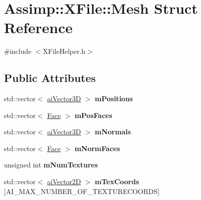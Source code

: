 \hypertarget{struct_assimp_1_1_x_file_1_1_mesh}{\section{Assimp\+:\+:X\+File\+:\+:Mesh Struct Reference}
\label{struct_assimp_1_1_x_file_1_1_mesh}
}


{\ttfamily \#include $<$X\+File\+Helper.\+h$>$}

\subsection*{Public Attributes}
\begin{DoxyCompactItemize}
\item 
\hypertarget{struct_assimp_1_1_x_file_1_1_mesh_ab46ed3ee07e3ae844591022285e7b9e9}{std\+::vector$<$ \hyperlink{structai_vector3_d}{ai\+Vector3\+D} $>$ {\bfseries m\+Positions}}\label{struct_assimp_1_1_x_file_1_1_mesh_ab46ed3ee07e3ae844591022285e7b9e9}

\item 
\hypertarget{struct_assimp_1_1_x_file_1_1_mesh_a8afe57d4a9153e77fbf56564475593ad}{std\+::vector$<$ \hyperlink{struct_assimp_1_1_x_file_1_1_face}{Face} $>$ {\bfseries m\+Pos\+Faces}}\label{struct_assimp_1_1_x_file_1_1_mesh_a8afe57d4a9153e77fbf56564475593ad}

\item 
\hypertarget{struct_assimp_1_1_x_file_1_1_mesh_abe823b959673f2e65b619dbbfdeafbdb}{std\+::vector$<$ \hyperlink{structai_vector3_d}{ai\+Vector3\+D} $>$ {\bfseries m\+Normals}}\label{struct_assimp_1_1_x_file_1_1_mesh_abe823b959673f2e65b619dbbfdeafbdb}

\item 
\hypertarget{struct_assimp_1_1_x_file_1_1_mesh_aec40ab3ed9ccb6dd0fc252895b05c7e6}{std\+::vector$<$ \hyperlink{struct_assimp_1_1_x_file_1_1_face}{Face} $>$ {\bfseries m\+Norm\+Faces}}\label{struct_assimp_1_1_x_file_1_1_mesh_aec40ab3ed9ccb6dd0fc252895b05c7e6}

\item 
\hypertarget{struct_assimp_1_1_x_file_1_1_mesh_aeebc45d3fe42cbc8c0ceab14fd35180a}{unsigned int {\bfseries m\+Num\+Textures}}\label{struct_assimp_1_1_x_file_1_1_mesh_aeebc45d3fe42cbc8c0ceab14fd35180a}

\item 
\hypertarget{struct_assimp_1_1_x_file_1_1_mesh_ade54d88b3060c6ae75d382ff27629558}{std\+::vector$<$ \hyperlink{structai_vector2_d}{ai\+Vector2\+D} $>$ {\bfseries m\+Tex\+Coords} \mbox{[}A\+I\+\_\+\+M\+A\+X\+\_\+\+N\+U\+M\+B\+E\+R\+\_\+\+O\+F\+\_\+\+T\+E\+X\+T\+U\+R\+E\+C\+O\+O\+R\+D\+S\mbox{]}}\label{struct_assimp_1_1_x_file_1_1_mesh_ade54d88b3060c6ae75d382ff27629558}


\end{DoxyCompactItemize}
